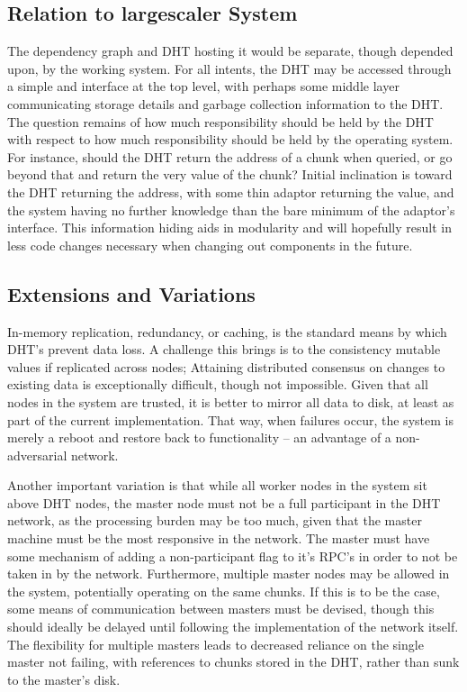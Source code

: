 \subsection{Relation to largescaler System}

The dependency graph and DHT hosting it would be separate, though depended upon, by the working \lsr{} system.
For all intents, the DHT may be accessed through a simple  and  interface at the top level, with perhaps some middle layer communicating storage details and garbage collection information to the DHT.
The question remains of how much responsibility should be held by the DHT with respect to how much responsibility should be held by the operating \lsr{} system.
For instance, should the DHT return the address of a chunk when queried, or go beyond that and return the very value of the chunk?
Initial inclination is toward the DHT returning the address, with some thin adaptor returning the value, and the system having no further knowledge than the bare minimum of the adaptor's interface.
This information hiding aids in modularity and will hopefully result in less code changes necessary when changing out components in the future\cite{gamma1995design}.

\subsection{Extensions and Variations}

In-memory replication, redundancy, or caching, is the standard means by which DHT's prevent data loss.
A challenge this brings is to the consistency mutable values if replicated across nodes;
Attaining distributed consensus on changes to existing data is exceptionally difficult, though not impossible\cite{brewer1999cap}\cite{gilbert2002brewer}.
Given that all nodes in the system are trusted, it is better to mirror all data to disk, at least as part of the current implementation.
That way, when failures occur, the system is merely a reboot and restore back to functionality -- an advantage of a non-adversarial network.

Another important variation is that while all worker nodes in the system sit above DHT nodes, the master node must not be a full participant in the DHT network, as the processing burden may be too much, given that the master machine must be the most responsive in the network.
The master must have some mechanism of adding a non-participant flag to it's RPC's in order to not be taken in by the network.
Furthermore, multiple master nodes may be allowed in the system, potentially operating on the same chunks.
If this is to be the case, some means of communication between masters must be devised, though this should ideally be delayed until following the implementation of the network itself.
The flexibility for multiple masters leads to decreased reliance on the single master not failing, with references to chunks stored in the DHT, rather than sunk to the master's disk.

